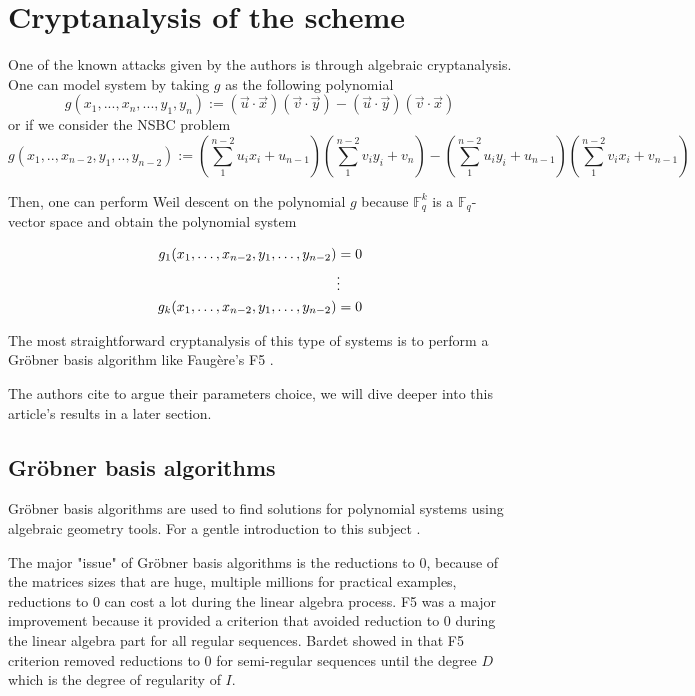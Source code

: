 \documentclass[english]{article}
\begin{document}
		\section{Cryptanalysis of the scheme}
		One of the known attacks given by the authors is through algebraic cryptanalysis.
		One can model system by taking $g$ as the following polynomial
		$$
		g(x_1,...,x_n,...,y_1,y_n) := (\vec{u} \cdot \vec{x})(\vec{v} \cdot \vec{y}) - (\vec{u} \cdot \vec{y})(\vec{v} \cdot \vec{x})
		$$
		or if we consider the NSBC problem
		$$
		g(x_1,..,x_{n-2},y_1,..,y_{n-2}) := (\sum_{1}^{n-2}u_{i}x_{i} + u_{n-1})(\sum_{1}^{n-2}v_{i}y_{i} + v_{n}) - (\sum_{1}^{n-2}u_{i}y_{i} + u_{n-1})(\sum_{1}^{n-2}v_{i}x_{i} + v_{n-1})
		$$
		
		Then, one can perform Weil descent on the polynomial $g$ because $\mathbb{F}_q^k$ is a $\mathbb{F}_q$-vector space and obtain the polynomial system
		

		\begin{align}
			g_1(x_1, \dots, x_{n-2}, y_1, \dots, y_{n-2}) &= 0 \notag \\
			&\vdots \notag \\
			g_k(x_1, \dots, x_{n-2}, y_1, \dots, y_{n-2}) &= 0 \notag
		\end{align}
		
		The most straightforward cryptanalysis of this type of systems is to perform a Gröbner basis algorithm like Faugère's F5 \cite{F02}.
		
		The authors cite \cite{FSS11} to argue their parameters choice, we will dive deeper into this article's results in a later section.

		\subsection{Gröbner basis algorithms}
		Gröbner basis algorithms are used to find solutions for polynomial systems using algebraic geometry tools. For a gentle introduction to this subject \cite{CLS}.
		
		The major "issue" of Gröbner basis algorithms is the reductions to 0, because of the matrices sizes that are huge, multiple millions for practical examples,
		reductions to 0 can cost a lot during the linear algebra process. F5 \cite{F02} was a major improvement because it provided a criterion that avoided reduction to 0 during the linear algebra part for all regular sequences.
		Bardet showed in \cite{Bardet04} that F5 criterion removed reductions to 0 for semi-regular sequences until the degree $D$ which is the degree of regularity of $I$.
		
\end{document}
